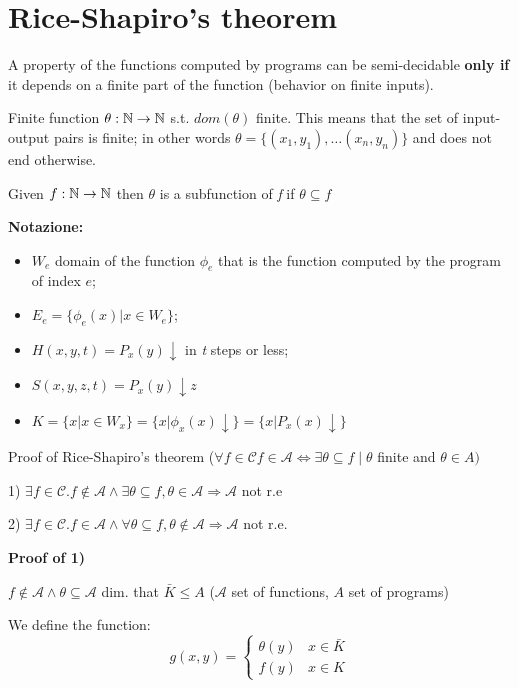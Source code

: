 \chapter {Rice-Shapiro's theorem}
A property of the functions computed by programs can be semi-decidable \textbf{only if} it depends on a finite part of the function (behavior on finite inputs).

Finite function $ \theta: \mathbb{N}\rightarrow\mathbb{N} $ s.t. $ dom(\theta) $ finite. This means that the set of input-output pairs is finite; in other words $ \theta = \{(x_1,y_1),\dots(x_n,y_n) \} $ and does not end otherwise.

Given $ f:\mathbb{N}\rightarrow\mathbb{N} $ then $ \theta  $ is a subfunction of \textit{f} if $ \theta \subseteq f $

\textbf{Notazione:}
\begin{itemize}
\item $ W_e $ domain of the function $ \phi_e $ that is the function computed by the program of index $e$;
\item $ E_e = \{\phi_e(x)|x\in W_e \}$;
\item $ H(x,y,t) = P_x(y)\downarrow $ in \textit{t} steps or less;
\item $ S(x,y,z,t) = P_x(y)\downarrow z $
\item $ K = \{x|x\in W_x \} = \{x|\phi_x(x)\downarrow \} = \{x|P_x(x)\downarrow \}$
\end{itemize}

Proof of Rice-Shapiro's theorem ($ \forall f \in \mathcal{C} f \in \mathcal{A} \Leftrightarrow \exists\theta\subseteq f \mid \theta $ finite and $ \theta\in A) $

1) $ \exists f \in \mathcal{C}. f \not\in \mathcal{A} \land \exists\theta\subseteq f, \theta\in\mathcal{A} \Rightarrow \mathcal{A}$ not r.e

2) $ \exists f \in \mathcal{C}. f\in\mathcal{A} \land \forall\theta\subseteq f, \theta\not\in\mathcal{A}\Rightarrow \mathcal{A} $ not r.e.

\textbf{Proof of 1)}

$ f\not\in \mathcal{A} \land \theta\subseteq \mathcal{A}$ dim. that $ \bar{K}\leq A $ ($ \mathcal{A} $ set of functions, $A$ set of programs)

We define the function:
\begin{equation*}
  g(x,y) = \begin{cases}
    \theta(y) & x \in \bar{K} \\
    f(y)      & x \in K
  \end{cases}
\end{equation*}

